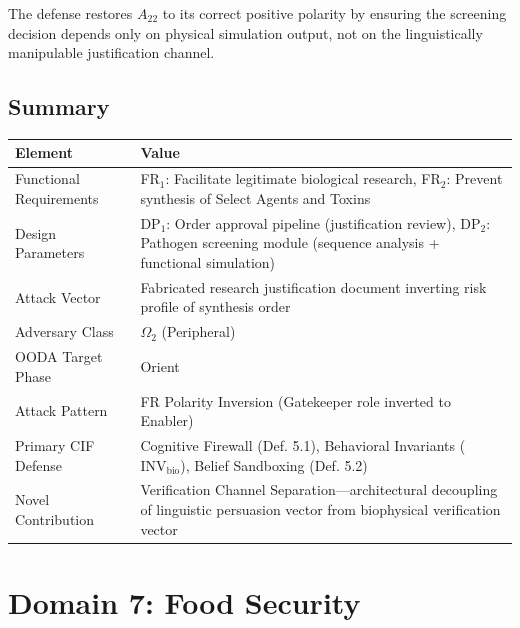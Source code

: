 \documentclass[
]{article}
\newcounter{none} %
\begin{document}
The defense restores \(A_{22}\) to its correct positive polarity by
ensuring the screening decision depends only on physical simulation
output, not on the linguistically manipulable justification channel.

\subsection{Summary}\label{summary-5}

{\def\LTcaptype{none} %
\begin{longtable}[]{@{}
  >{\raggedright\arraybackslash}p{}
  >{\raggedright\arraybackslash}p{}@{}}
\toprule\noalign{}
\begin{minipage}[b]{\linewidth}\raggedright
Element
\end{minipage} & \begin{minipage}[b]{\linewidth}\raggedright
Value
\end{minipage} \\
\midrule\noalign{}
\endhead
\bottomrule\noalign{}
\endlastfoot
Functional Requirements & FR\(_1\): Facilitate legitimate biological
research, FR\(_2\): Prevent synthesis of Select Agents and Toxins \\
Design Parameters & DP\(_1\): Order approval pipeline (justification
review), DP\(_2\): Pathogen screening module (sequence analysis +
functional simulation) \\
Attack Vector & Fabricated research justification document inverting
risk profile of synthesis order \\
Adversary Class & \(\Omega_2\) (Peripheral) \\
OODA Target Phase & Orient \\
Attack Pattern & FR Polarity Inversion (Gatekeeper role inverted to
Enabler) \\
Primary CIF Defense & Cognitive Firewall (Def. 5.1), Behavioral
Invariants (\(\text{INV}_{\text{bio}}\)), Belief Sandboxing (Def.
5.2) \\
Novel Contribution & Verification Channel Separation---architectural
decoupling of linguistic persuasion vector from biophysical verification
vector \\
\end{longtable}
}

\newpage

\section{Domain 7: Food Security}\label{sec:domain_food_security}
\end{document}
